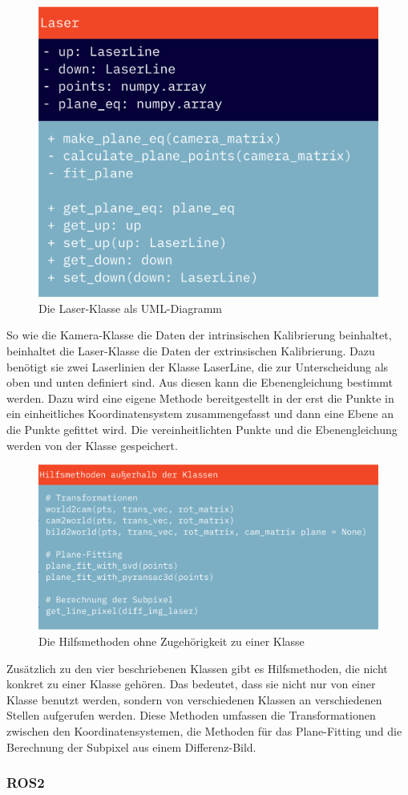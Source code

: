 		\begin{figure}[h]
			\centering
			\includegraphics[width=0.35\linewidth]{img/hauptteil/software/Laser_UML.png}
			\caption{Die Laser-Klasse als UML-Diagramm}
			\label{fig:laser_uml}
		\end{figure}
		So wie die Kamera-Klasse die Daten der intrinsischen Kalibrierung beinhaltet, beinhaltet die Laser-Klasse die Daten der extrinsischen Kalibrierung. Dazu benötigt sie zwei Laserlinien der Klasse LaserLine, die zur Unterscheidung als \glqq oben\grqq{} und \glqq unten\grqq{} definiert sind. Aus diesen kann die Ebenengleichung bestimmt werden. Dazu wird eine eigene Methode bereitgestellt in der erst die Punkte in ein einheitliches Koordinatensystem zusammengefasst und dann eine Ebene an die Punkte gefittet wird. Die vereinheitlichten Punkte und die Ebenengleichung werden von der Klasse gespeichert.
		\newpage
		\begin{figure}[h]
			\centering
			\includegraphics[width=0.7\linewidth]{img/hauptteil/software/Hilfsmethoden_UML.png}
			\caption{Die Hilfsmethoden ohne Zugehörigkeit zu einer Klasse}
			\label{fig:hilfsmethoden_uml}
		\end{figure}
		Zusätzlich zu den vier beschriebenen Klassen gibt es Hilfsmethoden, die nicht konkret zu einer Klasse gehören. Das bedeutet, dass sie nicht nur von einer Klasse benutzt werden, sondern von verschiedenen Klassen an verschiedenen Stellen aufgerufen werden. Diese Methoden umfassen die Transformationen zwischen den Koordinatensystemen, die Methoden für das Plane-Fitting und die Berechnung der Subpixel aus einem Differenz-Bild.
		
		\subsubsection{ROS2}
		
